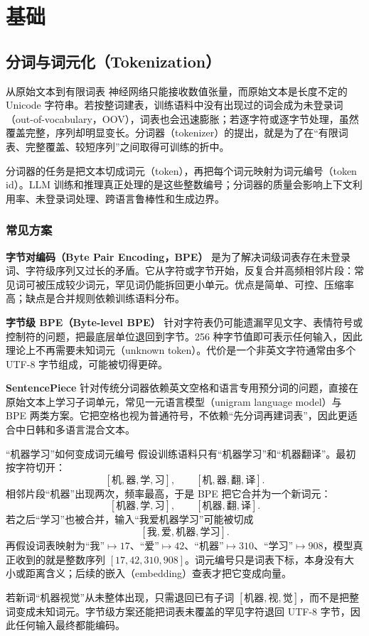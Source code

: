 \part{基础}

\chapter{分词与词元化（Tokenization）}
\label{sec:tokenization}

\begin{motivationbox}{从原始文本到有限词表}
神经网络只能接收数值张量，而原始文本是长度不定的 Unicode 字符串。若按整词建表，训练语料中没有出现过的词会成为未登录词（out-of-vocabulary，OOV），词表也会迅速膨胀；若逐字符或逐字节处理，虽然覆盖完整，序列却明显变长。分词器（tokenizer）的提出，就是为了在“有限词表、完整覆盖、较短序列”之间取得可训练的折中。
\end{motivationbox}

分词器的任务是把文本切成词元（token），再把每个词元映射为词元编号（token id）。LLM 训练和推理真正处理的是这些整数编号；分词器的质量会影响上下文利用率、未登录词处理、跨语言鲁棒性和生成边界。

\section{常见方案}

\textbf{字节对编码（Byte Pair Encoding，BPE）} 是为了解决词级词表存在未登录词、字符级序列又过长的矛盾。它从字符或字节开始，反复合并高频相邻片段：常见词可被压成较少词元，罕见词仍能拆回更小单元。优点是简单、可控、压缩率高；缺点是合并规则依赖训练语料分布。

\textbf{字节级 BPE（Byte-level BPE）} 针对字符表仍可能遗漏罕见文字、表情符号或控制符的问题，把最底层单位退回到字节。256 种字节值即可表示任何输入，因此理论上不再需要未知词元（unknown token）。代价是一个非英文字符通常由多个 UTF-8 字节组成，可能被切得更碎。

\textbf{SentencePiece} 针对传统分词器依赖英文空格和语言专用预分词的问题，直接在原始文本上学习子词单元，常见一元语言模型（unigram language model）与 BPE 两类方案。它把空格也视为普通符号，不依赖“先分词再建词表”，因此更适合中日韩和多语言混合文本。

\begin{examplebox}{“机器学习”如何变成词元编号}
假设训练语料只有“机器学习”和“机器翻译”。最初按字符切开：
\[
[\text{机},\text{器},\text{学},\text{习}],\qquad
[\text{机},\text{器},\text{翻},\text{译}].
\]
相邻片段“机器”出现两次，频率最高，于是 BPE 把它合并为一个新词元：
\[
[\text{机器},\text{学},\text{习}],\qquad
[\text{机器},\text{翻},\text{译}].
\]
若之后“学习”也被合并，输入“我爱机器学习”可能被切成
\[
[\text{我},\text{爱},\text{机器},\text{学习}].
\]
再假设词表映射为“我”$\mapsto17$、“爱”$\mapsto42$、“机器”$\mapsto310$、“学习”$\mapsto908$，模型真正收到的就是整数序列 $[17,42,310,908]$。词元编号只是词表下标，本身没有大小或距离含义；后续的嵌入（embedding）查表才把它变成向量。

若新词“机器视觉”从未整体出现，只需退回已有子词 $[\text{机器},\text{视},\text{觉}]$，而不是把整词变成未知词元。字节级方案还能把词表未覆盖的罕见字符退回 UTF-8 字节，因此任何输入最终都能编码。
\end{examplebox}

